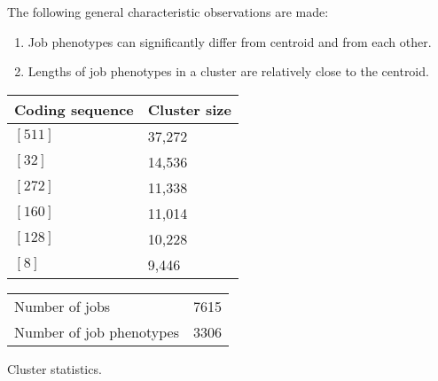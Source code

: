 \documentclass{jhps}
\begin{document}
The following general characteristic observations are made:
\begin{enumerate}
 \item Job phenotypes can significantly differ from centroid and from each other.
 \item Lengths of job phenotypes in a cluster are relatively close to the centroid.
\end{enumerate}

\noindent\begin{minipage}{\textwidth}

\begingroup
  \centering
  \begin{tabular}{ll}
    Coding sequence & Cluster size \\
    \hline
    $[511]$ & 37,272 \\
    $[32]$  & 14,536 \\
    $[272]$ & 11,338 \\
    $[160]$ & 11,014 \\
    $[128]$ & 10,228 \\
    $[8]$   & 9,446  \\
  \end{tabular}
  \label{tab:bin:largest_clusters}
\endgroup

\medskip

\captionsetup{type=table}
\begingroup
  \begin{subtable}{\textwidth}
  \centering
  \begin{tabular}{lr}
    Number of jobs & 7615 \\
    Number of job phenotypes & 3306 \\
  \end{tabular}
  \caption{Cluster statistics.}
  \label{tab:bin_all:stats}
  \end{subtable}
\endgroup

\medskip


\end{minipage}
\end{document}

